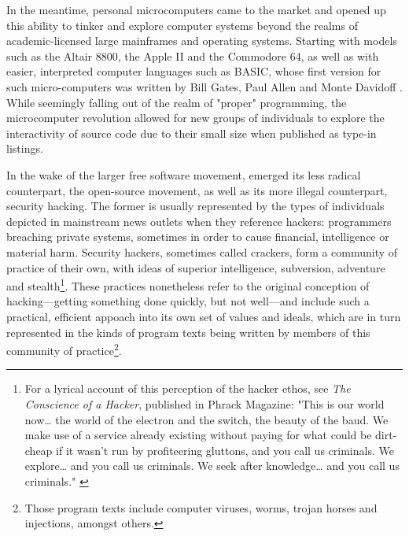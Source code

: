 In the meantime, personal microcomputers came to the market and opened up this ability to tinker and explore computer systems beyond the realms of academic-licensed large mainframes and operating systems. Starting with models such as the Altair 8800, the Apple II and the Commodore 64, as well as with easier, interpreted computer languages such as BASIC, whose first version for such micro-computers was written by Bill Gates, Paul Allen and Monte Davidoff \citep{montfort_10_2014}. While seemingly falling out of the realm of "proper" programming, the microcomputer revolution allowed for new groups of individuals to explore the interactivity of source code due to their small size when published as type-in listings.

In the wake of the larger free software movement, emerged its less radical counterpart, the open-source movement, as well as its more illegal counterpart, security hacking. The former is usually represented by the types of individuals depicted in mainstream news outlets when they reference hackers: programmers breaching private systems, sometimes in order to cause financial, intelligence or material harm. Security hackers, sometimes called crackers, form a community of practice of their own, with ideas of superior intelligence, subversion, adventure and stealth\footnote{For a lyrical account of this perception of the hacker ethos, see \emph{The Conscience of a Hacker}, published in Phrack Magazine: "This is our world now\dots{} the world of the electron and the switch, the beauty of the baud.  We make use of a service already existing without paying for what could be dirt-cheap if it wasn't run by profiteering gluttons, and you call us criminals.  We explore\dots{} and you call us criminals.  We seek after knowledge\dots{} and you call us criminals." \citep{mentor+++_textbackslash_1986}}. These practices nonetheless refer to the original conception of hacking—getting something done quickly, but not well—and include such a practical, efficient appoach into its own set of values and ideals, which are in turn represented in the kinds of program texts being written by members of this community of practice\footnote{Those program texts include computer viruses, worms, trojan horses and injections, amongst others.}.


